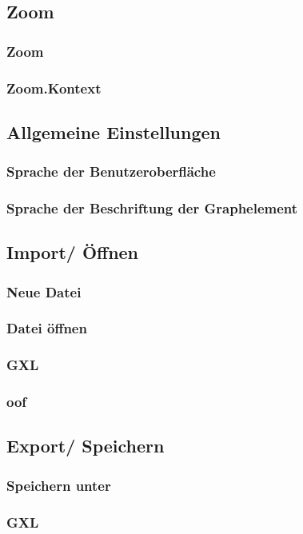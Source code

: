 \documentclass[enabledeprecatedfontcommands,fontsize=11pt,paper=a4,twoside]{scrartcl}
\begin{document}
	\subsection{Zoom} \label{zoom}
		\subsubsection{Zoom}
		\subsubsection{Zoom.Kontext}
	\subsection{Allgemeine Einstellungen} \label{settings}
		\subsubsection{Sprache der Benutzeroberfläche}
		\subsubsection{Sprache der Beschriftung der Graphelement}
	\subsection{Import/ Öffnen} \label{import}
		\subsubsection{Neue Datei}
		\subsubsection{Datei öffnen}
		\subsubsection{GXL}
		\subsubsection{oof}
	\subsection{Export/ Speichern} \label{export}
		\subsubsection{Speichern unter}
		\subsubsection{GXL}
\end{document}
